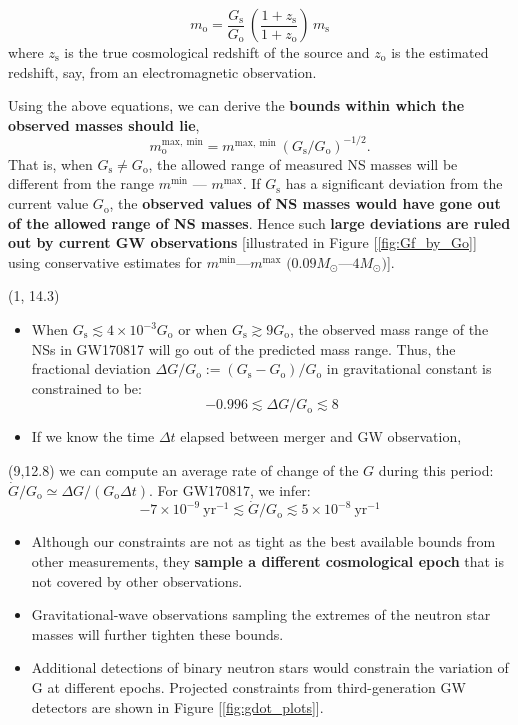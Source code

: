 \documentclass[a1,portrait]{a1poster}
\newcommand{\headingcolor}{\color{BannerElevenColor}}
\newcommand{\ms}{m_\mathrm{s}}
\newcommand{\mo}{m_\mathrm{o}}
\newcommand{\zs}{z_\mathrm{s}}
\newcommand{\zo}{z_\mathrm{o}}
\newcommand{\Gs}{G_\mathrm{s}}
\newcommand{\Go}{G_\mathrm{o}}
\def\LHead#1{\noindent{\LARGE \headingcolor #1}\smallskip}
\begin{document}
\begin{textblock}{7}
\begin{equation}
\mo = \frac{\Gs}{\Go} \, \left(\frac{1+\zs}{1+\zo}\right) \, \ms
\label{eq:m_obs_with_z}
\end{equation}
where $\zs$ is the true cosmological redshift of the source and $\zo$ is the estimated redshift, say, from an electromagnetic observation.

Using the above equations, we can derive the \textbf{bounds within which the observed masses should lie},
\begin{equation}
\boxed{\mo^\mathrm{max,~min} = m^\mathrm{max,~min}~(\Gs/\Go)^{-1/2}. }
\label{eq:m_obs_fn_Gf}
\end{equation}
That is, when $\Gs \neq \Go$, the allowed range of measured NS masses will be different from the range $m^\mathrm{min}$ --- $m^\mathrm{max}$. If $\Gs$ has a significant deviation from the current value $\Go$, the \textbf{observed values of NS masses  would have gone out of the allowed range of NS masses}. Hence such \textbf{large deviations are ruled out by current GW observations} [illustrated in Figure [\ref{fig:Gf_by_Go}] using conservative estimates for $m^\mathrm{min}$---$m^\mathrm{max}$ $(0.09 M_{\odot}$---$4M_{\odot})$].

\begin{textblock}{7}(1, 14.3)
	\LHead{Results}
	\begin{itemize}
		\item When {$\Gs \lesssim 4\times 10^{-3} \Go$ or when $\Gs \gtrsim 9 \Go$}, the observed mass range of the NSs in GW170817 will go out of the predicted mass range. Thus, the fractional deviation $\Delta G/\Go := (\Gs - \Go)/\Go$ in gravitational constant is constrained to be: $$\boxed{-0.996 \lesssim \Delta G/\Go \lesssim 8 }$$
		\item If we know the time $\Delta t$ elapsed between  merger and  GW observation, 
	\end{itemize}
\end{textblock}

\begin{textblock}{7}(9,12.8)
		we can compute an average rate of change of the $G$ during this period: $\dot{G}/\Go \simeq \Delta G/(\Go \Delta t)$. For GW170817, we infer:
		$$\boxed{-7 \times 10^{-9}~\mathrm{yr}^{-1} \lesssim \dot{G}/\Go \lesssim 5 \times 10^{-8} ~\mathrm{yr}^{-1}}$$
	\LHead{Summary and Future Directions}
	\begin{itemize}
		\item Although our constraints are not as tight as the best available bounds from other measurements, they \textbf{sample a different cosmological epoch} that is not covered by other observations.
		\item Gravitational-wave observations sampling the extremes of the neutron star masses will further tighten these bounds.
		\item Additional detections of binary neutron stars would constrain the variation of G at different epochs. Projected constraints from third-generation GW detectors are shown in Figure [\ref{fig:gdot_plots}].
	\end{itemize}
\end{textblock}

\end{textblock}
\end{document}
